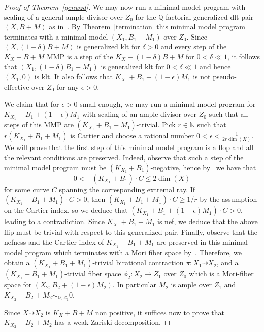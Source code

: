 \documentclass{amsart}
\renewcommand{\qq}{\mathbb{Q}}
\theoremstyle{remark}
\numberwithin{equation}{section}
\begin{document}
\begin{proof}[Proof of Theorem~\ref{genwzd}]
We may now run a minimal model program with scaling of a general ample divisor over $Z_0$ for the $\qq$-factorial generalized dlt pair $(X,B+M)$ as in~\cite[\S 4]{BZ16}.
By Theorem~\ref{termination} this minimal model program terminates with a minimal model $(X_1,B_1+M_1)$ over $Z_0$. Since $(X,(1-\delta)B+M)$ is generalized klt for $\delta >0$ and every step of the $K_X+B+M$ MMP is a step of the $K_X+(1-\delta)B+M$ for $0<\delta \ll 1$, it follows that $(X_1,(1-\delta)B_1+M_1)$   is generalized klt for $0<\delta \ll 1$
and hence $(X_1,0)$ is klt. It also follows that $K_{X_1}+B_1+(1-\epsilon)M_1$ is not pseudo-effective over $Z_0$ for any $\epsilon >0$.


We claim that for $\epsilon>0$ small enough, we may run a minimal model program for $K_{X_1}+B_1+(1-\epsilon)M_1$ with scaling of an ample divisor over $Z_0$ such that all steps of this MMP are $(K_{X_1}+B_1+M_1)$-trivial. Pick $r\in \mathbb N$ such that $r(K_{X_1}+B_1+M_1)$ is Cartier and choose a rational number $0<\epsilon<\frac 1{2r\dim(X)} $. We will prove that the first step of this minimal model program is a flop and all the relevant conditions are preserved. Indeed, observe that such a step of the minimal model program must be $(K_{X_1}+B_1)$-negative, hence by~\cite{Kaw91} we have that 
\[
0 < -(K_{X_1}+B_1) \cdot C \leq 2\dim(X)
\]
for some curve $C$ spanning the corresponding extremal ray.
If $(K_{X_1}+B_1+M_1)\cdot C >0$, then $(K_{X_1}+B_1+M_1)\cdot C \geq 1/r$ by the assumption on the Cartier index, 
so we deduce that $(K_{X_1}+B_1+(1-\epsilon)M_1)\cdot C>0$, leading to a contradiction.
Since $K_{X_1}+B_1+M_1$ is nef, we deduce that the above flip must be trivial with respect to this generalized pair. 
Finally, observe that the nefness and the Cartier index of $K_{X_1}+B_1+M_1$ are preserved in this minimal model program which terminates with a Mori fiber space by~\cite{BCHM}.
Therefore, we obtain a $(K_{X_1}+B_1+M_1)$-trivial birational contraction $\pi \colon X_1 \dashrightarrow X_2$, and a $(K_{X_1}+B_1+M_1)$-trivial fiber space $\phi_2 \colon X_2\rightarrow Z_1$ over $Z_0$
which is a Mori-fiber space for $(X_2, B_2+(1-\epsilon)M_2)$. In particular $M_2$ is ample over $Z_1$ and $K_{X_2}+B_2+M_2 \sim _{\qq,Z_1}0$.

 Since $X\dasharrow X_2$ is $K_X+B+M$ non positive, it suffices now to prove that $K_{X_2}+B_2+M_2$ has a weak Zariski decomposition.



\end{proof}
\end{document}
